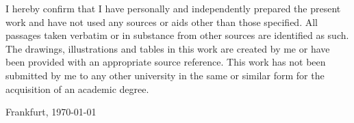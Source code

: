 %
%


I hereby confirm that I have personally and independently prepared the present work and have not used any sources or aids other than those specified. All passages taken verbatim or in substance from other sources are identified as such. The drawings, illustrations and tables in this work are created by me or have been provided with an appropriate source reference. This work has not been submitted by me to any other university in the same or similar form for the acquisition of an academic degree.

\vspace{2cm}
Frankfurt, \today \dotfill

\hspace{10cm} {\footnotesize \fullname}

\vspace{2cm}

